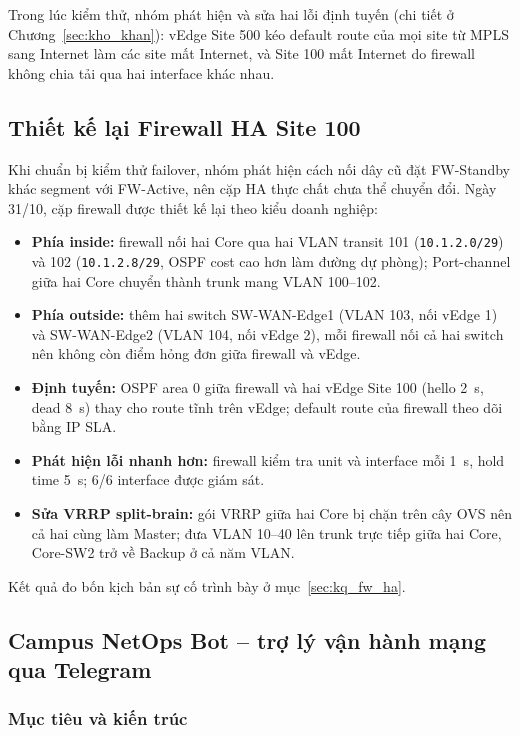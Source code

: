 Trong lúc kiểm thử, nhóm phát hiện và sửa hai lỗi định tuyến (chi tiết ở Chương~\ref{sec:kho_khan}): vEdge Site 500 kéo default route của mọi site từ MPLS sang Internet làm các site mất Internet, và Site 100 mất Internet do firewall không chia tải qua hai interface khác nhau.

\subsection{Thiết kế lại Firewall HA Site 100}\label{sec:fw_ha}

Khi chuẩn bị kiểm thử failover, nhóm phát hiện cách nối dây cũ đặt FW-Standby khác segment với FW-Active, nên cặp HA thực chất chưa thể chuyển đổi. Ngày 31/10, cặp firewall được thiết kế lại theo kiểu doanh nghiệp:

\begin{itemize}
    \item \textbf{Phía inside:} firewall nối hai Core qua hai VLAN transit 101 (\texttt{10.1.2.0/29}) và 102 (\texttt{10.1.2.8/29}, OSPF cost cao hơn làm đường dự phòng); Port-channel giữa hai Core chuyển thành trunk mang VLAN 100--102.
    \item \textbf{Phía outside:} thêm hai switch SW-WAN-Edge1 (VLAN 103, nối vEdge 1) và SW-WAN-Edge2 (VLAN 104, nối vEdge 2), mỗi firewall nối cả hai switch nên không còn điểm hỏng đơn giữa firewall và vEdge.
    \item \textbf{Định tuyến:} OSPF area 0 giữa firewall và hai vEdge Site 100 (hello 2~s, dead 8~s) thay cho route tĩnh trên vEdge; default route của firewall theo dõi bằng IP SLA.
    \item \textbf{Phát hiện lỗi nhanh hơn:} firewall kiểm tra unit và interface mỗi 1~s, hold time 5~s; 6/6 interface được giám sát.
    \item \textbf{Sửa VRRP split-brain:} gói VRRP giữa hai Core bị chặn trên cây OVS nên cả hai cùng làm Master; đưa VLAN 10--40 lên trunk trực tiếp giữa hai Core, Core-SW2 trở về Backup ở cả năm VLAN.
\end{itemize}

Kết quả đo bốn kịch bản sự cố trình bày ở mục~\ref{sec:kq_fw_ha}.

\subsection{Campus NetOps Bot -- trợ lý vận hành mạng qua Telegram}

\subsubsection{Mục tiêu và kiến trúc}

